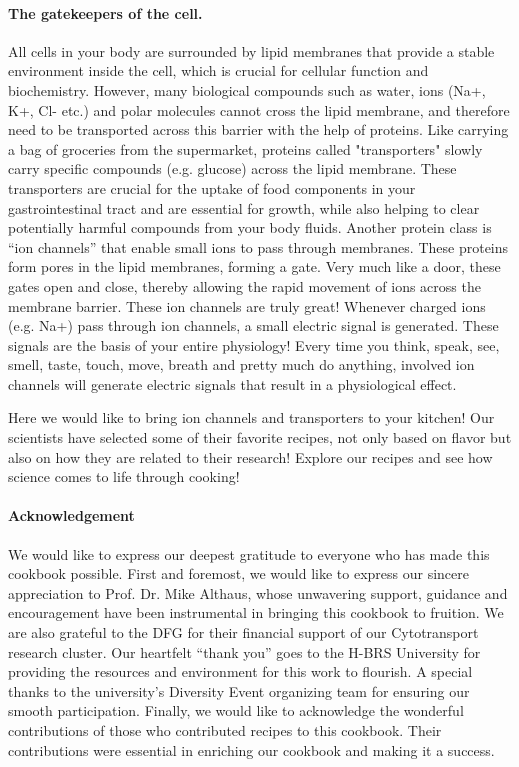 \documentclass{article}
\begin{document}
\paragraph{The gatekeepers of the cell.}
All cells in your body are surrounded by lipid membranes that provide a stable environment inside the cell, which is crucial for cellular function and biochemistry. However, many biological compounds such as water, ions (Na+, K+, Cl- etc.) and polar molecules cannot cross the lipid membrane, and therefore need to be transported across this barrier with the help of proteins. Like carrying a bag of groceries from the supermarket, proteins called "transporters" slowly carry specific compounds (e.g. glucose) across the lipid membrane. These transporters are crucial for the uptake of food components in your gastrointestinal tract and are essential for growth, while also helping to clear potentially harmful compounds from your body fluids. Another protein class is ``ion channels'' that enable small ions to pass through membranes. These proteins form pores in the lipid membranes, forming a gate. Very much like a door, these gates open and close, thereby allowing the rapid movement of ions across the membrane barrier. These ion channels are truly great! Whenever charged ions (e.g. Na+) pass through ion channels, a small electric signal is generated. These signals are the basis of your entire physiology! Every time you think, speak, see, smell, taste, touch, move, breath and pretty much do anything, involved ion channels will generate electric signals that result in a physiological effect.

Here we would like to bring ion channels and transporters to your kitchen! Our scientists have selected some of their favorite recipes, not only based on flavor but also on how they are related to their research! Explore our recipes and see how science comes to life through cooking!

\paragraph{Acknowledgement}

We would like to express our deepest gratitude to everyone who has made this cookbook possible. First and foremost, we would like to express our sincere appreciation to Prof. Dr. Mike Althaus, whose unwavering support, guidance and encouragement have been instrumental in bringing this cookbook to fruition. We are also grateful to the DFG for their financial support of our Cytotransport research cluster. Our heartfelt ``thank you'' goes to the H-BRS University for providing the resources and environment for this work to flourish. A special thanks to the university's Diversity Event organizing team for ensuring our smooth participation. Finally, we would like to acknowledge the wonderful contributions of those who contributed recipes to this cookbook. Their contributions were essential in enriching our cookbook and making it a success.
\end{document}
